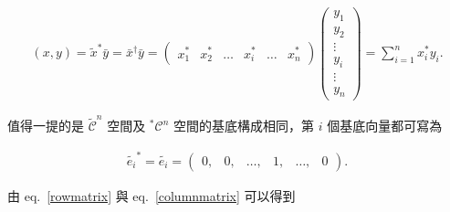\begin{align}
(x,y)=\tilde{x}^*\bar{y}=\bar{x}^\dag\bar{y}=\begin{pmatrix}x_1^*&x_2^*&\ldots & x_i^*&\ldots &x_n^*\end{pmatrix}\begin{pmatrix}y_1\\y_2\\\vdots \\y_i\\\vdots\\y_n\end{pmatrix}=\sum_{i=1}^nx_i^*y_i.
\end{align}

值得一提的是 $ \tilde{\mathcal{C}}^n $ 空間及 $ ^*\mathcal{C}^n $ 空間的基底構成相同，第 $i$ 個基底向量都可寫為

\begin{align}\label{rowmatrix}
\tilde{e_i}^*=\tilde{e_i}=\begin{pmatrix}0,&0,&\ldots, & 1, & \ldots, & 0 \end{pmatrix}.
\end{align}

由 eq.~\ref{rowmatrix} 與 eq.~\ref{columnmatrix} 可以得到


